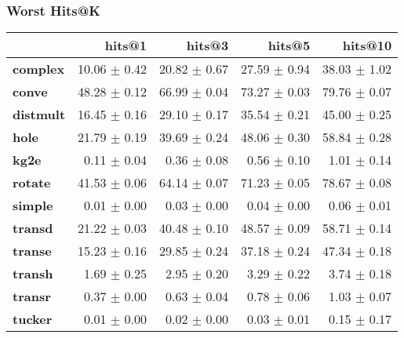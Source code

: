 \documentclass{article}
\begin{document}
    \subsubsection{Worst Hits@K}
    \begin{center}
    \begin{tabular}{lrrrr}
\toprule
{} &        hits@1 &        hits@3 &        hits@5 &       hits@10 \\
\midrule
\textbf{complex } &  10.06 $\pm$ 0.42 &  20.82 $\pm$ 0.67 &  27.59 $\pm$ 0.94 &  38.03 $\pm$ 1.02 \\
\textbf{conve   } &  48.28 $\pm$ 0.12 &  66.99 $\pm$ 0.04 &  73.27 $\pm$ 0.03 &  79.76 $\pm$ 0.07 \\
\textbf{distmult} &  16.45 $\pm$ 0.16 &  29.10 $\pm$ 0.17 &  35.54 $\pm$ 0.21 &  45.00 $\pm$ 0.25 \\
\textbf{hole    } &  21.79 $\pm$ 0.19 &  39.69 $\pm$ 0.24 &  48.06 $\pm$ 0.30 &  58.84 $\pm$ 0.28 \\
\textbf{kg2e    } &   0.11 $\pm$ 0.04 &   0.36 $\pm$ 0.08 &   0.56 $\pm$ 0.10 &   1.01 $\pm$ 0.14 \\
\textbf{rotate  } &  41.53 $\pm$ 0.06 &  64.14 $\pm$ 0.07 &  71.23 $\pm$ 0.05 &  78.67 $\pm$ 0.08 \\
\textbf{simple  } &   0.01 $\pm$ 0.00 &   0.03 $\pm$ 0.00 &   0.04 $\pm$ 0.00 &   0.06 $\pm$ 0.01 \\
\textbf{transd  } &  21.22 $\pm$ 0.03 &  40.48 $\pm$ 0.10 &  48.57 $\pm$ 0.09 &  58.71 $\pm$ 0.14 \\
\textbf{transe  } &  15.23 $\pm$ 0.16 &  29.85 $\pm$ 0.24 &  37.18 $\pm$ 0.24 &  47.34 $\pm$ 0.18 \\
\textbf{transh  } &   1.69 $\pm$ 0.25 &   2.95 $\pm$ 0.20 &   3.29 $\pm$ 0.22 &   3.74 $\pm$ 0.18 \\
\textbf{transr  } &   0.37 $\pm$ 0.00 &   0.63 $\pm$ 0.04 &   0.78 $\pm$ 0.06 &   1.03 $\pm$ 0.07 \\
\textbf{tucker  } &   0.01 $\pm$ 0.00 &   0.02 $\pm$ 0.00 &   0.03 $\pm$ 0.01 &   0.15 $\pm$ 0.17 \\
\bottomrule
\end{tabular}

    \end{center}
\end{document}
